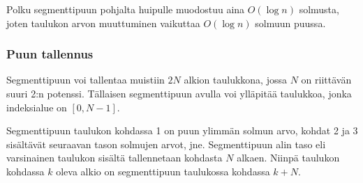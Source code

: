 Polku segmenttipuun pohjalta huipulle muodostuu aina $O(\log n)$ solmusta,
joten taulukon arvon muuttuminen vaikuttaa $O(\log n)$ solmuun puussa.

\subsubsection{Puun tallennus}

Segmenttipuun voi tallentaa muistiin 
$2N$ alkion taulukkona,
jossa $N$ on riittävän suuri 2:n potenssi.
Tällaisen segmenttipuun avulla voi ylläpitää
taulukkoa, jonka indeksialue on $[0,N-1]$.

Segmenttipuun taulukon
kohdassa 1 on puun ylimmän solmun arvo,
kohdat 2 ja 3 sisältävät seuraavan tason
solmujen arvot, jne.
Segmenttipuun alin taso eli varsinainen
taulukon sisältä tallennetaan
kohdasta $N$ alkaen.
Niinpä taulukon kohdassa $k$ oleva alkio
on segmenttipuun taulukossa kohdassa $k+N$.

